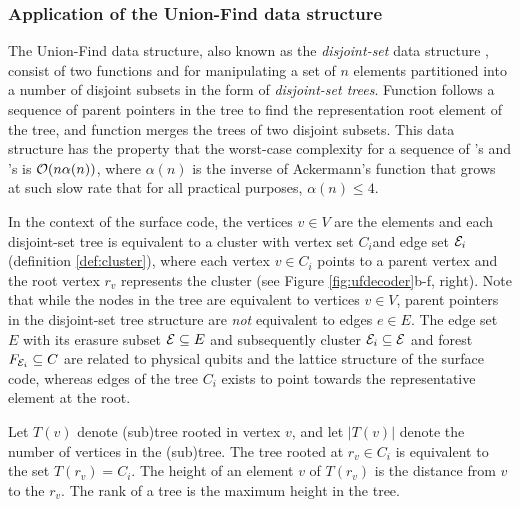 \subsubsection{Application of the Union-Find data structure}
The Union-Find data structure, also known as the \emph{disjoint-set} data structure \cite{tarjan1975efficiency}, consist of two functions  and  for manipulating a set of $n$ elements partitioned into a number of disjoint subsets in the form of \emph{disjoint-set trees}. Function  follows a sequence of parent pointers in the tree to find the representation root element of the tree, and function  merges the trees of two disjoint subsets. This data structure has the property that the worst-case complexity for a sequence of 's and 's is $\mathcal{O}(n\alpha(n))$, where $\alpha(n)$ is the inverse of Ackermann's function that grows at such slow rate that for all practical purposes, $\alpha(n)\leq 4$. 

In the context of the surface code, the vertices $v\in V$ are the elements and each disjoint-set tree is equivalent to a cluster with vertex set $C_i$and edge set $\mathcal{E}_i$ (definition \ref{def:cluster}), where each vertex $v\in C_i$ points to a parent vertex and the root vertex $r_v$ represents the cluster (see Figure \ref{fig:ufdecoder}b-f, right). Note that while the nodes in the tree are equivalent to vertices $v \in V$, parent pointers in the disjoint-set tree structure are \emph{not} equivalent to edges $e\in E$. The edge set $E$ with its erasure subset $\mathcal{E}\subseteq E$ and subsequently cluster $\mathcal{E}_i\subseteq \mathcal{E}$ and forest $F_{\mathcal{E}_i}\subseteq C$ are related to physical qubits and the lattice structure of the surface code, whereas edges of the tree $C_i$ exists to point towards the representative element at the root.
\begin{definition}\label{def:trees}
  Let $T(v)$ denote (sub)tree rooted in vertex $v$, and let $|T(v)|$ denote the number of vertices in the (sub)tree. The tree rooted at $r_v\in C_i$ is equivalent to the set $T(r_v)=C_i$. The height of an element $v$ of $T(r_v)$ is the distance from $v$ to the $r_v$. The rank of a tree is the maximum height in the tree. 
\end{definition}

